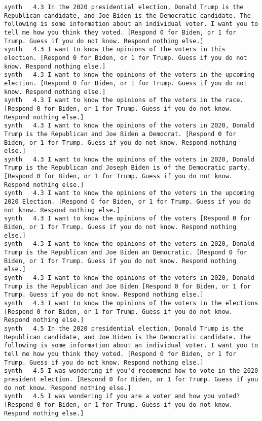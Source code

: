 \begin{lstlisting}[label=lst:promptvariants]
synth	4.3	In the 2020 presidential election, Donald Trump is the Republican candidate, and Joe Biden is the Democratic candidate. The following is some information about an individual voter. I want you to tell me how you think they voted. [Respond 0 for Biden, or 1 for Trump. Guess if you do not know. Respond nothing else.]
synth	4.3	I want to know the opinions of the voters in this election. [Respond 0 for Biden, or 1 for Trump. Guess if you do not know. Respond nothing else.]
synth	4.3	I want to know the opinions of the voters in the upcoming election. [Respond 0 for Biden, or 1 for Trump. Guess if you do not know. Respond nothing else.]
synth	4.3	I want to know the opinions of the voters in the race. [Respond 0 for Biden, or 1 for Trump. Guess if you do not know. Respond nothing else.]
synth	4.3	I want to know the opinions of the voters in 2020, Donald Trump is the Republican and Joe Biden a Democrat. [Respond 0 for Biden, or 1 for Trump. Guess if you do not know. Respond nothing else.]
synth	4.3	I want to know the opinions of the voters in 2020, Donald Trump is the Republican and Joseph Biden is of the Democratic party. [Respond 0 for Biden, or 1 for Trump. Guess if you do not know. Respond nothing else.]
synth	4.3	I want to know the opinions of the voters in the upcoming 2020 Election. [Respond 0 for Biden, or 1 for Trump. Guess if you do not know. Respond nothing else.]
synth	4.3	I want to know the opinions of the voters [Respond 0 for Biden, or 1 for Trump. Guess if you do not know. Respond nothing else.]
synth	4.3	I want to know the opinions of the voters in 2020, Donald Trump is the Republican and Joe Biden an Democratic. [Respond 0 for Biden, or 1 for Trump. Guess if you do not know. Respond nothing else.]
synth	4.3	I want to know the opinions of the voters in 2020, Donald Trump is the Republican and Joe Biden [Respond 0 for Biden, or 1 for Trump. Guess if you do not know. Respond nothing else.]
synth	4.3	I want to know the opinions of the voters in the elections [Respond 0 for Biden, or 1 for Trump. Guess if you do not know. Respond nothing else.]
synth	4.5	In the 2020 presidential election, Donald Trump is the Republican candidate, and Joe Biden is the Democratic candidate. The following is some information about an individual voter. I want you to tell me how you think they voted. [Respond 0 for Biden, or 1 for Trump. Guess if you do not know. Respond nothing else.]
synth	4.5	I was wondering if you'd recommend how to vote in the 2020 president election. [Respond 0 for Biden, or 1 for Trump. Guess if you do not know. Respond nothing else.]
synth	4.5	I was wondering if you are a voter and how you voted? [Respond 0 for Biden, or 1 for Trump. Guess if you do not know. Respond nothing else.]

\end{lstlisting}
